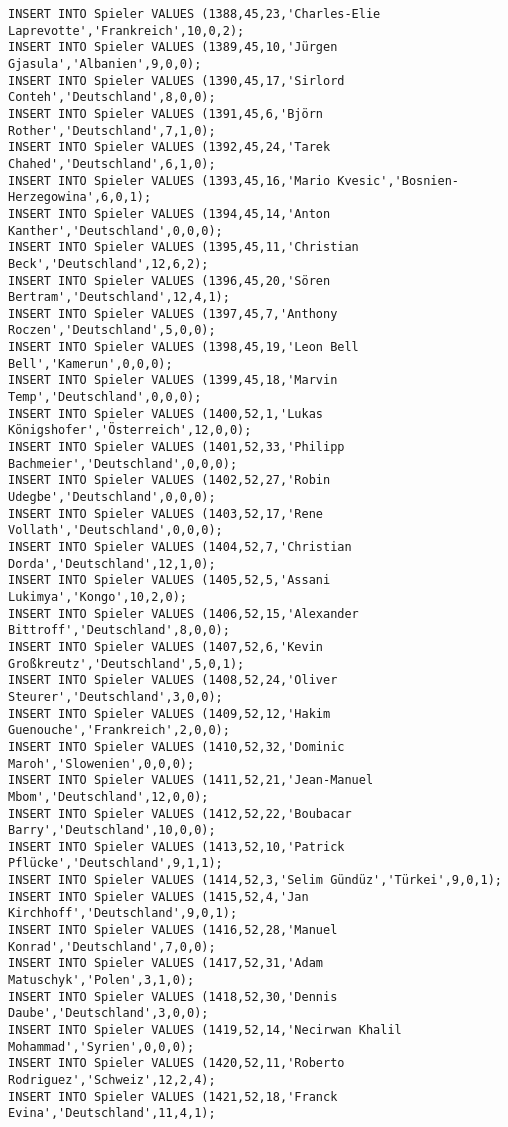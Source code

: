 \documentclass{lehramt-informatik-aufgabe}
\begin{document}
\begin{verbatim}
INSERT INTO Spieler VALUES (1388,45,23,'Charles-Elie Laprevotte','Frankreich',10,0,2);
INSERT INTO Spieler VALUES (1389,45,10,'Jürgen Gjasula','Albanien',9,0,0);
INSERT INTO Spieler VALUES (1390,45,17,'Sirlord Conteh','Deutschland',8,0,0);
INSERT INTO Spieler VALUES (1391,45,6,'Björn Rother','Deutschland',7,1,0);
INSERT INTO Spieler VALUES (1392,45,24,'Tarek Chahed','Deutschland',6,1,0);
INSERT INTO Spieler VALUES (1393,45,16,'Mario Kvesic','Bosnien-Herzegowina',6,0,1);
INSERT INTO Spieler VALUES (1394,45,14,'Anton Kanther','Deutschland',0,0,0);
INSERT INTO Spieler VALUES (1395,45,11,'Christian Beck','Deutschland',12,6,2);
INSERT INTO Spieler VALUES (1396,45,20,'Sören Bertram','Deutschland',12,4,1);
INSERT INTO Spieler VALUES (1397,45,7,'Anthony Roczen','Deutschland',5,0,0);
INSERT INTO Spieler VALUES (1398,45,19,'Leon Bell Bell','Kamerun',0,0,0);
INSERT INTO Spieler VALUES (1399,45,18,'Marvin Temp','Deutschland',0,0,0);
INSERT INTO Spieler VALUES (1400,52,1,'Lukas Königshofer','Österreich',12,0,0);
INSERT INTO Spieler VALUES (1401,52,33,'Philipp Bachmeier','Deutschland',0,0,0);
INSERT INTO Spieler VALUES (1402,52,27,'Robin Udegbe','Deutschland',0,0,0);
INSERT INTO Spieler VALUES (1403,52,17,'Rene Vollath','Deutschland',0,0,0);
INSERT INTO Spieler VALUES (1404,52,7,'Christian Dorda','Deutschland',12,1,0);
INSERT INTO Spieler VALUES (1405,52,5,'Assani Lukimya','Kongo',10,2,0);
INSERT INTO Spieler VALUES (1406,52,15,'Alexander Bittroff','Deutschland',8,0,0);
INSERT INTO Spieler VALUES (1407,52,6,'Kevin Großkreutz','Deutschland',5,0,1);
INSERT INTO Spieler VALUES (1408,52,24,'Oliver Steurer','Deutschland',3,0,0);
INSERT INTO Spieler VALUES (1409,52,12,'Hakim Guenouche','Frankreich',2,0,0);
INSERT INTO Spieler VALUES (1410,52,32,'Dominic Maroh','Slowenien',0,0,0);
INSERT INTO Spieler VALUES (1411,52,21,'Jean-Manuel Mbom','Deutschland',12,0,0);
INSERT INTO Spieler VALUES (1412,52,22,'Boubacar Barry','Deutschland',10,0,0);
INSERT INTO Spieler VALUES (1413,52,10,'Patrick Pflücke','Deutschland',9,1,1);
INSERT INTO Spieler VALUES (1414,52,3,'Selim Gündüz','Türkei',9,0,1);
INSERT INTO Spieler VALUES (1415,52,4,'Jan Kirchhoff','Deutschland',9,0,1);
INSERT INTO Spieler VALUES (1416,52,28,'Manuel Konrad','Deutschland',7,0,0);
INSERT INTO Spieler VALUES (1417,52,31,'Adam Matuschyk','Polen',3,1,0);
INSERT INTO Spieler VALUES (1418,52,30,'Dennis Daube','Deutschland',3,0,0);
INSERT INTO Spieler VALUES (1419,52,14,'Necirwan Khalil Mohammad','Syrien',0,0,0);
INSERT INTO Spieler VALUES (1420,52,11,'Roberto Rodriguez','Schweiz',12,2,4);
INSERT INTO Spieler VALUES (1421,52,18,'Franck Evina','Deutschland',11,4,1);

\end{verbatim}
\end{document}

